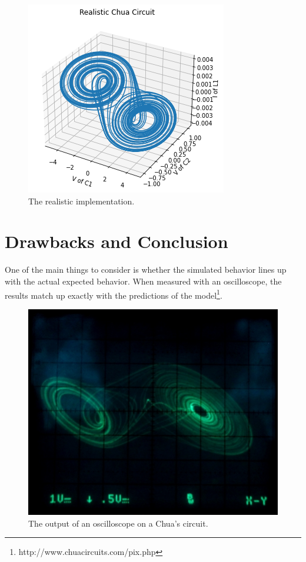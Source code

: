 \documentclass{article}
\begin{document}
    \begin{figure}[h!]
        \centering
        \includegraphics[scale = 0.6]{Images/realistic.png}
        \caption{The realistic implementation.}
        \label{fig:my_label}
    \end{figure}

    \newpage


\section{Drawbacks and Conclusion}

    One of the main things to consider is whether the simulated behavior lines up with the actual expected behavior. When measured with an oscilloscope, the results match up exactly with the predictions of the model\footnote{http://www.chuacircuits.com/pix.php}. 
    \begin{figure}[h!]
        \centering
        \includegraphics[scale = 0.5]{Images/real_chua.jpg}
        \caption{The output of an oscilloscope on a Chua's circuit.}
        \label{fig:my_label}
    \end{figure}
\end{document}
